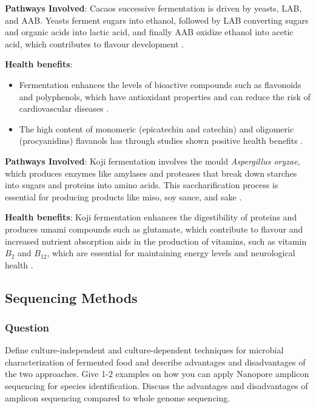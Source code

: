 \textbf{Pathways Involved}: Cacaos successive fermentation is driven by yeasts, LAB, and AAB. Yeasts ferment sugars into ethanol, followed by LAB converting sugars and organic acids into lactic acid, and finally AAB oxidize ethanol into acetic acid, which contributes to flavour development \cite*{ORM_1}.

\textbf{Health benefits}:
\begin{itemize}
    \item Fermentation enhances the levels of bioactive compounds such as flavonoids and polyphenols, which have antioxidant properties and can reduce the risk of cardiovascular diseases \cite*{ORM_1}.
    \item The high content of monomeric (epicatechin and catechin) and oligomeric (procyanidins) flavanols has through studies shown positive health benefits \cite*{ORM_1}.
\end{itemize}

\textbf{Pathways Involved}: Koji fermentation involves the mould \textit{Aspergillus oryzae}, which produces enzymes like amylases and proteases that break down starches into sugars and proteins into amino acids. This saccharification process is essential for producing products like miso, soy sauce, and sake \cite*{LS11}.

\textbf{Health benefits}:
Koji fermentation enhances the digestibility of proteins and produces umami compounds such as glutamate, which contribute to flavour and increased nutrient absorption aids in the production of vitamins, such as vitamin $B_2$ and $B_{12}$, which are essential for maintaining energy levels and neurological health \cite*{LS11}.

\subsection{Sequencing Methods}
\subsubsection*{Question}
Define culture-independent and culture-dependent techniques for microbial characterization of fermented food and describe advantages and disadvantages of the two approaches. Give 1-2 examples on how you can apply Nanopore amplicon sequencing for species identification. Discuss the advantages and disadvantages of amplicon sequencing compared to whole genome sequencing. 

